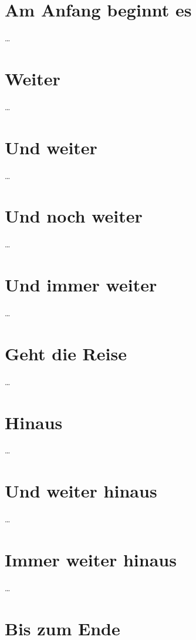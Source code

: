 \documentclass{scrbook}
\begin{document}
\chapter{Am Anfang beginnt es}\dots
\chapter{Weiter}\dots
\chapter{Und weiter}\dots
\chapter{Und noch weiter}\dots
\chapter{Und immer weiter}\dots
\chapter{Geht die Reise}\dots
\chapter{Hinaus}\dots
\chapter{Und weiter hinaus}\dots
\chapter{Immer weiter hinaus}\dots
\chapter{Bis zum Ende}
\end{document}
